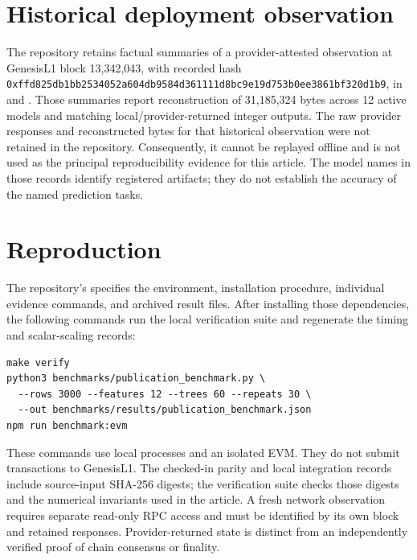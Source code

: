 \documentclass[10pt,a4paper]{article}
\theoremstyle{remark}
\begin{document}
\section{Historical deployment observation}
\label{sec:supp-historical}

The repository retains factual summaries of a provider-attested observation
at GenesisL1 block 13,342,043, with recorded hash
\nolinkurl{0xffd825db1bb2534052a604db9584d361111d8bc9e19d753b0ee3861bf320d1b9},
in  and
. Those summaries
report reconstruction of 31,185,324 bytes across 12 active models and
matching local/provider-returned integer outputs. The raw provider responses
and reconstructed bytes for that historical observation were not retained
in the repository. Consequently, it cannot be replayed offline and is not
used as the principal reproducibility evidence for this article. The model
names in those records identify registered artifacts; they do not establish
the accuracy of the named prediction tasks.

\section{Reproduction}
\label{sec:supp-reproduction}

The repository's  specifies the environment,
installation procedure, individual evidence commands, and archived result
files. After installing those dependencies, the following commands run the
local verification suite and regenerate the timing and scalar-scaling
records:

\begin{verbatim}
make verify
python3 benchmarks/publication_benchmark.py \
  --rows 3000 --features 12 --trees 60 --repeats 30 \
  --out benchmarks/results/publication_benchmark.json
npm run benchmark:evm
\end{verbatim}

These commands use local processes and an isolated EVM. They do not submit
transactions to GenesisL1. The checked-in parity and local integration
records include source-input SHA-256 digests; the verification suite checks
those digests and the numerical invariants used in the article. A fresh
network observation requires separate read-only RPC access and must be
identified by its own block and retained responses. Provider-returned state
is distinct from an independently verified proof of chain consensus or
finality.
\end{document}
